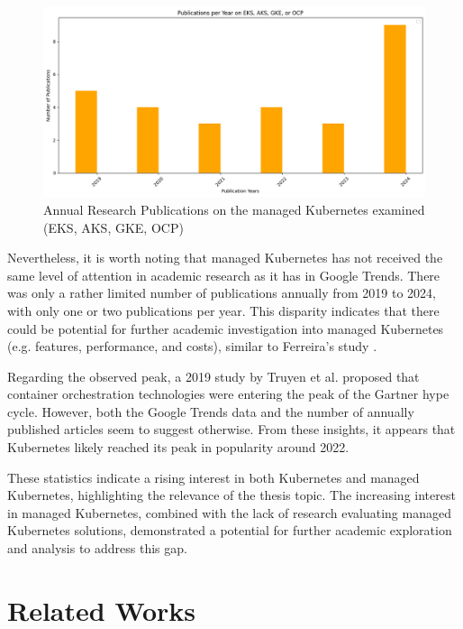 \FloatBarrier


\begin{figure}
    \centering
    \includegraphics[width=1\linewidth]{resources/managed-k8s-broaden-scope.png}
    \caption{Annual Research Publications on the managed Kubernetes examined (EKS, AKS, GKE, OCP)}
    \label{fig:managed-k8s-broaden-scope}
\end{figure}


Nevertheless, it is worth noting that managed Kubernetes has not received the same level of attention in academic research as it has in Google Trends. There was only a rather limited number of publications annually from 2019 to 2024, with only one or two publications per year. This disparity indicates that there could be potential for further academic investigation into managed Kubernetes (e.g. features, performance, and costs), similar to Ferreira’s study \cite{pereiraferreiraPerformanceEvaluationContainers2019}.

Regarding the observed peak, a 2019 study by Truyen et al. \cite{truyenComprehensiveFeatureComparison2019} proposed that container orchestration technologies were entering the peak of the Gartner hype cycle. However, both the Google Trends data and the number of annually published articles seem to suggest otherwise. From these insights, it appears that Kubernetes likely reached its peak in popularity around 2022.

These statistics indicate a rising interest in both Kubernetes and managed Kubernetes, highlighting the relevance of the thesis topic. The increasing interest in managed Kubernetes, combined with the lack of research evaluating managed Kubernetes solutions, demonstrated a potential for further academic exploration and analysis to address this gap.

\section{Related Works}
